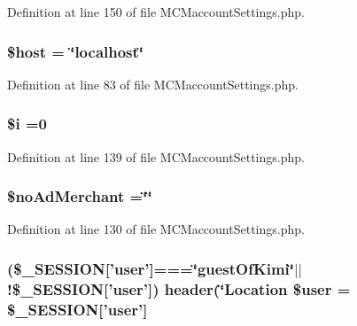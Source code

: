 Definition at line 150 of file M\-C\-Maccount\-Settings.\-php.

\hypertarget{_m_c_maccount_settings_8php_a711797613cb863ca0756df789c396bf2}{
\subsubsection[{\$host}]{\setlength{\rightskip}{0pt plus 5cm}\$host = \char`\"{}localhost\char`\"{}}}\label{_m_c_maccount_settings_8php_a711797613cb863ca0756df789c396bf2}


Definition at line 83 of file M\-C\-Maccount\-Settings.\-php.

\hypertarget{_m_c_maccount_settings_8php_a83018d9153d17d91fbcf3bc10158d34f}{
\subsubsection[{\$i}]{\setlength{\rightskip}{0pt plus 5cm}\$i =0}}\label{_m_c_maccount_settings_8php_a83018d9153d17d91fbcf3bc10158d34f}


Definition at line 139 of file M\-C\-Maccount\-Settings.\-php.

\hypertarget{_m_c_maccount_settings_8php_a40bc7f7e5d2e32caabe23be33f8ebfbc}{
\subsubsection[{\$no\-Ad\-Merchant}]{\setlength{\rightskip}{0pt plus 5cm}\$no\-Ad\-Merchant =\char`\"{}\char`\"{}}}\label{_m_c_maccount_settings_8php_a40bc7f7e5d2e32caabe23be33f8ebfbc}


Definition at line 130 of file M\-C\-Maccount\-Settings.\-php.

\hypertarget{_m_c_maccount_settings_8php_ad8982953e969b35c48447e32be546dca}{
\subsubsection[{\$user}]{ (\$\-\_\-\-S\-E\-S\-S\-I\-O\-N\mbox{[}'user'\mbox{]}===\char`\"{}guest\-Of\-Kimi\char`\"{}$|$$|$!\$\-\_\-\-S\-E\-S\-S\-I\-O\-N\mbox{[}'user'\mbox{]}) header(\char`\"{}Location \$user = \$\-\_\-\-S\-E\-S\-S\-I\-O\-N\mbox{[}'user'\mbox{]}}}\label{_m_c_maccount_settings_8php_ad8982953e969b35c48447e32be546dca}


